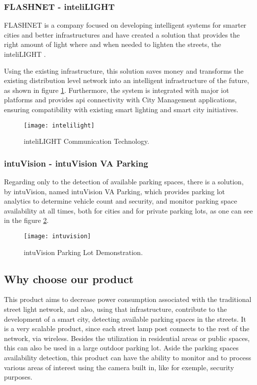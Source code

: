 \subsubsection{FLASHNET - inteliLIGHT}
FLASHNET is a company focused on developing intelligent systems for smarter cities and better infrastructures and have created a solution that provides the right amount of light where and when needed to lighten the streets, the inteliLIGHT \cite{inteli_light}.

Using the existing infrastructure, this solution saves money and transforms the existing distribution level network into an intelligent infrastructure of the future, as shown in figure \ref{fig:intelilight}. Furthermore, the system is integrated with major \ac{iot} platforms and provides \ac{api} connectivity with City Management applications, ensuring compatibility with existing smart lighting and smart city initiatives.

\begin{figure}[ht]
	\centering
	\texttt{[image: intelilight]}
	\caption{inteliLIGHT Communication Technology.}
	\label{fig:intelilight}
\end{figure}

\subsubsection{intuVision - intuVision VA Parking}
Regarding only to the detection of available parking spaces, there is a solution, by intuVision, named intuVision VA Parking, which provides parking lot analytics to determine vehicle count and security, and monitor parking space availability at all times, both for cities and for private parking lots, as one can see in the figure \ref{fig:intuvision}. \cite{parking}

\begin{figure}[ht]
	\centering
	\texttt{[image: intuvision]}
	\caption{intuVision Parking Lot Demonstration.}
	\label{fig:intuvision}
\end{figure}

\subsection{Why choose our product}

This product aims to decrease power consumption associated with the traditional street light network, and also, using that infrastructure, contribute to the development of a smart city, detecting available parking spaces in the streets. It is a very scalable product, since each street lamp post connects to the rest of the network, via wireless. Besides the utilization in residential areas or public spaces, this can also be used in a large outdoor parking lot. 
Aside the parking spaces availability detection, this product can have the ability to monitor and to process various areas of interest using the camera built in, like for exemple, security purposes.